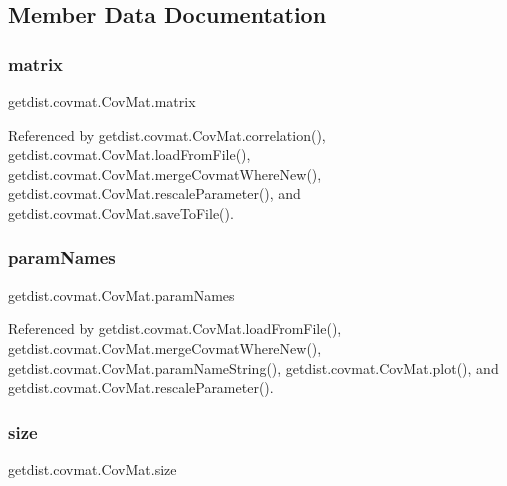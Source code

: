 \subsection{Member Data Documentation}
\mbox{\label{classgetdist_1_1covmat_1_1CovMat_abb601a3118265f1b3284e0c270f88ee6}} 
\subsubsection{\texorpdfstring{matrix}{matrix}}
{\footnotesize\ttfamily getdist.\+covmat.\+Cov\+Mat.\+matrix}



Referenced by getdist.\+covmat.\+Cov\+Mat.\+correlation(), getdist.\+covmat.\+Cov\+Mat.\+load\+From\+File(), getdist.\+covmat.\+Cov\+Mat.\+merge\+Covmat\+Where\+New(), getdist.\+covmat.\+Cov\+Mat.\+rescale\+Parameter(), and getdist.\+covmat.\+Cov\+Mat.\+save\+To\+File().

\mbox{\label{classgetdist_1_1covmat_1_1CovMat_aeb4d5170fe2277abd0d4a77e567caad2}} 
\subsubsection{\texorpdfstring{param\+Names}{paramNames}}
{\footnotesize\ttfamily getdist.\+covmat.\+Cov\+Mat.\+param\+Names}



Referenced by getdist.\+covmat.\+Cov\+Mat.\+load\+From\+File(), getdist.\+covmat.\+Cov\+Mat.\+merge\+Covmat\+Where\+New(), getdist.\+covmat.\+Cov\+Mat.\+param\+Name\+String(), getdist.\+covmat.\+Cov\+Mat.\+plot(), and getdist.\+covmat.\+Cov\+Mat.\+rescale\+Parameter().

\mbox{\label{classgetdist_1_1covmat_1_1CovMat_a7af1ee8db220767ce81239a696f7b717}} 
\subsubsection{\texorpdfstring{size}{size}}
{\footnotesize\ttfamily getdist.\+covmat.\+Cov\+Mat.\+size}




